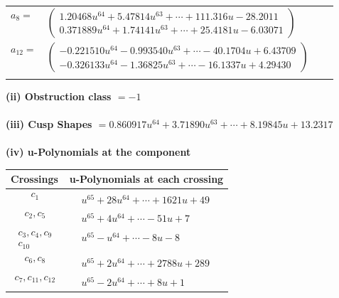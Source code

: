 \documentclass[1p]{elsarticle_modified}
\theoremstyle{definition}
\begin{document}
\begin{tabular}{m{7pt} m{180pt} m{7pt} m{180pt} }
\flushright $a_{8}=$&$\begin{pmatrix}1.20468 u^{64}+5.47814 u^{63}+\cdots+111.316 u-28.2011\\0.371889 u^{64}+1.74141 u^{63}+\cdots+25.4181 u-6.03071\end{pmatrix}$ \\
\flushright $a_{12}=$&$\begin{pmatrix}-0.221510 u^{64}-0.993540 u^{63}+\cdots-40.1704 u+6.43709\\-0.326133 u^{64}-1.36825 u^{63}+\cdots-16.1337 u+4.29430\end{pmatrix}$\\&\end{tabular}
\flushleft \textbf{(ii) Obstruction class $= -1$}\\~\\
\flushleft \textbf{(iii) Cusp Shapes $= 0.860917 u^{64}+3.71890 u^{63}+\cdots+8.19845 u+13.2317$}\\~\\
\newpage\renewcommand{\arraystretch}{1}
\flushleft \textbf{(iv) u-Polynomials at the component}\newline \\
\begin{tabular}{m{50pt}|m{274pt}}
Crossings & \hspace{64pt}u-Polynomials at each crossing \\
\hline $$\begin{aligned}c_{1}\end{aligned}$$&$\begin{aligned}
&u^{65}+28 u^{64}+\cdots+1621 u+49
\end{aligned}$\\
\hline $$\begin{aligned}c_{2},c_{5}\end{aligned}$$&$\begin{aligned}
&u^{65}+4 u^{64}+\cdots-51 u+7
\end{aligned}$\\
\hline $$\begin{aligned}c_{3},c_{4},c_{9}\\c_{10}\end{aligned}$$&$\begin{aligned}
&u^{65}- u^{64}+\cdots-8 u-8
\end{aligned}$\\
\hline $$\begin{aligned}c_{6},c_{8}\end{aligned}$$&$\begin{aligned}
&u^{65}+2 u^{64}+\cdots+2788 u+289
\end{aligned}$\\
\hline $$\begin{aligned}c_{7},c_{11},c_{12}\end{aligned}$$&$\begin{aligned}
&u^{65}-2 u^{64}+\cdots+8 u+1
\end{aligned}$\\
\hline
\end{tabular}\\~\\
\end{document}
